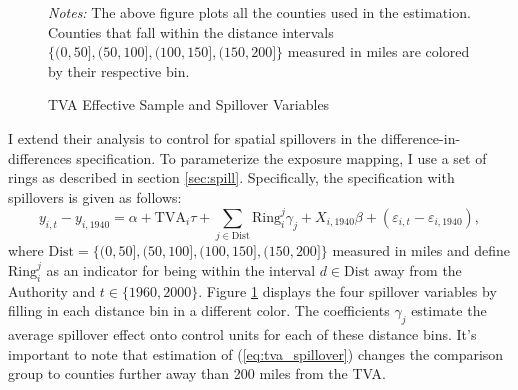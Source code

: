 \begin{figure}[tb!]
    \caption{TVA Effective Sample and Spillover Variables}
    \label{fig:tva_sample}

    {\centering
    }
    {\footnotesize \textit{Notes:} The above figure plots all the counties used in the estimation. Counties that fall within the distance intervals $\{ (0, 50], (50, 100], (100, 150], (150, 200] \}$ measured in miles are colored by their respective bin.} 
\end{figure}

I extend their analysis to control for spatial spillovers in the difference-in-differences specification. To parameterize the exposure mapping, I use a set of rings as described in section \ref{sec:spill}. Specifically, 
the specification with spillovers is given as follows:  
\begin{equation}\label{eq:tva_spillover}
    y_{i, t} - y_{i, 1940} = \alpha + \text{TVA}_i \tau + \sum_{j \in \text{Dist}} \text{Ring}_i^j \gamma_j + X_{i, 1940} \beta + (\varepsilon_{i, t} - \varepsilon_{i, 1940}),
\end{equation} 
where $\text{Dist} = \{(0, 50], (50, 100], (100, 150], (150, 200]\}$ measured in miles and define $\text{Ring}_i^j$ as an indicator for being within the interval $d \in \text{Dist}$ away from the Authority and $t \in \{1960, 2000\}$. Figure \ref{fig:tva_sample} displays the four spillover variables by filling in each distance bin in a different color. The coefficients $\gamma_j$ estimate the average spillover effect onto control units for each of these distance bins. It's important to note that estimation of (\ref{eq:tva_spillover}) changes the comparison group to counties further away than 200 miles from the TVA.

